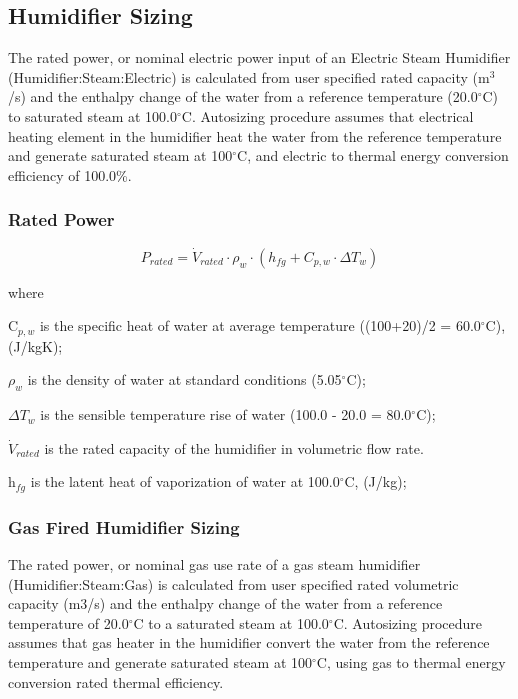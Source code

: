 \subsection{Humidifier Sizing}\label{humidifier-sizing}

The rated power, or nominal electric power input of an Electric Steam Humidifier (Humidifier:Steam:Electric) is calculated from user specified rated capacity (m\(^{3}\)/s) and the enthalpy change of the water from a reference temperature (20.0\(^{\circ}\)C) to saturated steam at 100.0\(^{\circ}\)C. Autosizing procedure assumes that electrical heating element in the humidifier heat the water from the reference temperature and generate saturated steam at 100\(^{\circ}\)C, and electric to thermal energy conversion efficiency of 100.0\%.

\subsubsection{Rated Power}\label{rated-power}

\begin{equation}
{P_{rated}} = {\dot V_{rated}} \cdot {\rho_w} \cdot \left( {{h_{fg}} + {C_{p,w}} \cdot \Delta {T_w}} \right)
\end{equation}

where

C\(_{p,w}\) is the specific heat of water at average temperature ((100+20)/2 = 60.0\(^{\circ}\)C), (J/kgK);

\(\rho_{w}\) is the density of water at standard conditions (5.05\(^{\circ}\)C);

\(\Delta T_{w}\) is the sensible temperature rise of water (100.0 - 20.0 = 80.0\(^{\circ}\)C);

\({\dot V_{rated}}\) is the rated capacity of the humidifier in volumetric flow rate.

h\(_{fg}\) is the latent heat of vaporization of water at 100.0\(^{\circ}\)C, (J/kg);

\subsubsection{Gas Fired Humidifier Sizing}\label{gas-fired-humidifier-sizing}

The rated power, or nominal gas use rate of a gas steam humidifier (Humidifier:Steam:Gas) is calculated from user specified rated volumetric capacity (m3/s) and the enthalpy change of the water from a reference temperature of 20.0\(^{\circ}\)C to a saturated steam at 100.0\(^{\circ}\)C. Autosizing procedure assumes that gas heater in the humidifier convert the water from the reference temperature and generate saturated steam at 100\(^{\circ}\)C, using gas to thermal energy conversion rated thermal efficiency.

